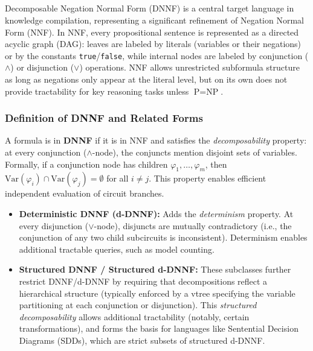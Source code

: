 \subsection{\color{blue}{D-dNNF}}

Decomposable Negation Normal Form (DNNF) is a central target language in knowledge compilation, representing a significant refinement of Negation Normal Form (NNF). In NNF, every propositional sentence is represented as a directed acyclic graph (DAG): leaves are labeled by literals (variables or their negations) or by the constants \texttt{true}/\texttt{false}, while internal nodes are labeled by conjunction ($\wedge$) or disjunction ($\vee$) operations. NNF allows unrestricted subformula structure as long as negations only appear at the literal level, but on its own does not provide tractability for key reasoning tasks unless $\text{P} = \text{NP}$.

\subsubsection{Definition of DNNF and Related Forms}
A formula is in \textbf{DNNF} if it is in NNF and satisfies the \emph{decomposability} property: at every conjunction ($\wedge$-node), the conjuncts mention disjoint sets of variables. Formally, if a conjunction node has children $\varphi_1, \ldots, \varphi_m$, then $\mathrm{Var}(\varphi_i) \cap \mathrm{Var}(\varphi_j) = \emptyset$ for all $i \neq j$. This property enables efficient independent evaluation of circuit branches.

\begin{itemize}
    \item \textbf{Deterministic DNNF (d-DNNF):} Adds the \emph{determinism} property. At every disjunction ($\vee$-node), disjuncts are mutually contradictory (i.e., the conjunction of any two child subcircuits is inconsistent). Determinism enables additional tractable queries, such as model counting.
    \item \textbf{Structured DNNF / Structured d-DNNF:} These subclasses further restrict DNNF/d-DNNF by requiring that decompositions reflect a hierarchical structure (typically enforced by a vtree specifying the variable partitioning at each conjunction or disjunction). This \emph{structured decomposability} allows additional tractability (notably, certain transformations), and forms the basis for languages like Sentential Decision Diagrams (SDDs), which are strict subsets of structured d-DNNF.
\end{itemize}

